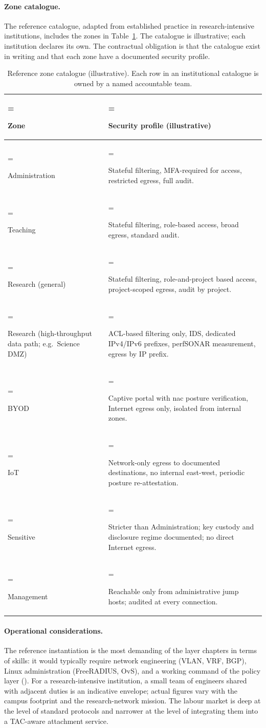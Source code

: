 \paragraph{Zone catalogue.} The reference catalogue, adapted from
established practice in research-intensive institutions, includes
the zones in Table~\ref{tab:nw-zones}. The catalogue is illustrative;
each institution declares its own. The contractual obligation is
that the catalogue exist in writing and that each zone have a
documented security profile.

\begin{table}[H]
\centering\small
\caption{Reference zone catalogue (illustrative). Each row in an
institutional catalogue is owned by a named accountable team.}
\label{tab:nw-zones}
\begin{tabularx}{\textwidth}{%
  >{\hsize=0.5\hsize\linewidth=\hsize\bfseries\raggedright\arraybackslash}X%
  >{\hsize=1.5\hsize\linewidth=\hsize\raggedright\arraybackslash}X%
}
\toprule
Zone & Security profile (illustrative) \\
\midrule
Administration & Stateful filtering, MFA-required for access, restricted egress, full audit. \\
Teaching       & Stateful filtering, role-based access, broad egress, standard audit. \\
Research (general) & Stateful filtering, role-and-project based access, project-scoped egress, audit by project. \\
Research (high-throughput data path; e.g.\ Science DMZ) & ACL-based filtering only, IDS, dedicated IPv4/IPv6 prefixes, perfSONAR measurement, egress by IP prefix. \\
BYOD           & Captive portal with \gls{nac} posture verification, Internet egress only, isolated from internal zones. \\
IoT            & Network-only egress to documented destinations, no internal east-west, periodic posture re-attestation. \\
Sensitive      & Stricter than Administration; key custody and disclosure regime documented; no direct Internet egress. \\
Management     & Reachable only from administrative jump hosts; audited at every connection. \\
\bottomrule
\end{tabularx}
\end{table}

\paragraph{Operational considerations.} The reference instantiation
is the most demanding of the layer chapters in terms of skills: it
would typically require network engineering (VLAN, VRF, BGP), Linux
administration (FreeRADIUS, OvS), and a working command of the
policy layer (). For a research-intensive
institution, a small team of engineers shared with adjacent duties
is an indicative envelope; actual figures vary with the campus
footprint and the research-network mission. The labour market is
deep at the level of
standard protocols and narrower at the level of integrating them
into a TAC-aware attachment service.

